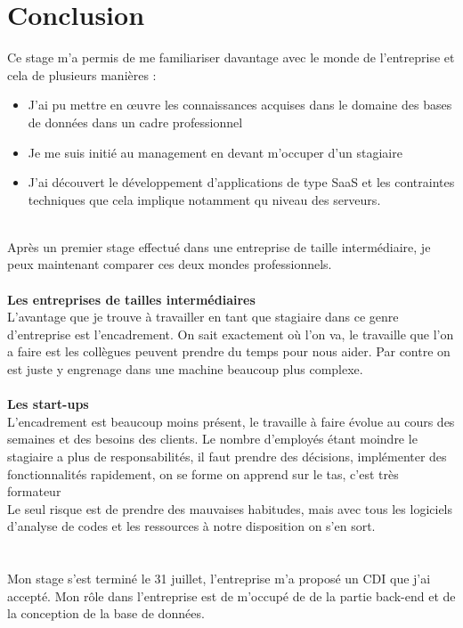 \section{Conclusion}
Ce stage m'a permis de me familiariser davantage avec le monde de l'entreprise et cela de plusieurs manières :
	\begin{itemize} 
		\item[\textbullet] J'ai pu mettre en œuvre les connaissances acquises dans le domaine des bases de données dans un cadre professionnel
		\item[\textbullet]Je me suis initié au management en devant m'occuper d'un stagiaire
		\item[\textbullet]J'ai découvert le développement d'applications de type SaaS et les contraintes techniques que cela implique notamment qu niveau des serveurs. 
	\end{itemize} 
\leavevmode \\
Après un premier stage effectué dans une entreprise de taille intermédiaire, je peux maintenant comparer ces deux mondes professionnels.
\\ \\
\textbf{Les entreprises de tailles intermédiaires}
\\
L'avantage que je trouve à travailler en tant que stagiaire dans ce genre d'entreprise est l'encadrement. On sait exactement où l'on va, le travaille que l'on a faire est les collègues peuvent prendre du temps pour nous aider. Par contre on est juste y engrenage dans une machine beaucoup plus complexe.
\\ \\
\textbf{Les start-ups}
\\
L'encadrement est beaucoup moins présent, le travaille à faire évolue au cours des semaines et des besoins des clients. Le nombre d'employés étant moindre le stagiaire a plus de responsabilités, il faut prendre des décisions, implémenter des fonctionnalités rapidement, on se forme on apprend sur le tas, c'est très formateur \\
Le seul risque est de prendre des mauvaises habitudes, mais avec tous les logiciels d'analyse de codes et les ressources à notre disposition on s'en sort.
\\
\\
\\

Mon stage s'est terminé le 31 juillet, l'entreprise m'a proposé un CDI que j'ai accepté. Mon rôle dans l'entreprise est de m'occupé de de la partie back-end et de la conception de la base de données.   

